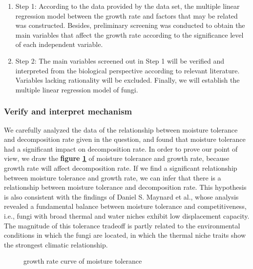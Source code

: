 \documentclass[12pt]{article}
\begin{document}
	
	\begin{enumerate}[\bfseries 1.]
		\item Step 1: According to the data provided by the data set, the multiple linear regression model between the growth rate and factors that may be related was constructed. Besides, preliminary screening was conducted to obtain the main variables that affect the growth rate according to the significance level of each independent variable.
		\item Step 2: The main variables screened out in Step 1 will be verified and interpreted from the biological perspective according to relevant literature. Variables lacking rationality will be excluded. Finally, we will establish the multiple linear regression model of fungi.
	\end{enumerate}\par
	
	\subsubsection{Verify and interpret mechanism}
	
	We carefully analyzed the data of the relationship between moisture tolerance and decomposition rate given in the question, and found that moisture tolerance had a significant impact on decomposition rate. In order to prove our point of view, we draw the \textbf{figure \ref{figure:moisture_tolerance_growth_rate}} of moisture tolerance and growth rate, because growth rate will affect decomposition rate. If we find a significant relationship between moisture tolerance and growth rate, we can infer that there is a relationship between moisture tolerance and decomposition rate. This hypothesis is also consistent with the findings of Daniel S. Maynard et al.\cite{3}, whose analysis revealed a fundamental balance between moisture tolerance and competitiveness, i.e., fungi with broad thermal and water niches exhibit low displacement capacity. The magnitude of this tolerance tradeoff is partly related to the environmental conditions in which the fungi are located, in which the thermal niche traits show the strongest climatic relationship.
	\begin{figure}[h]
		\centering
		\caption{growth rate curve of moisture tolerance}
		\label{figure:moisture_tolerance_growth_rate}
	\end{figure}
	
\end{document}
